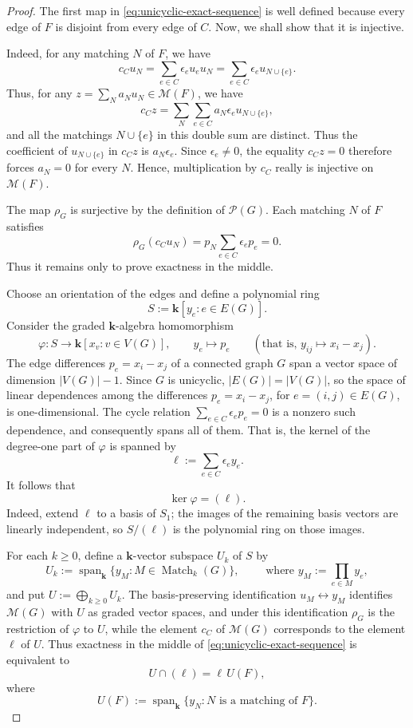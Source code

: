 \documentclass[12pt]{amsart}
\theoremstyle{definition}
\theoremstyle{remark}
\newcommand{\kk}{\mathbf{k}}
\newcommand{\Span}{\operatorname{span}}
\newcommand{\Match}{\operatorname{Match}}
\begin{document}
\begin{proof}
The first map in \eqref{eq:unicyclic-exact-sequence} is well defined because
every edge of $F$ is disjoint from every edge of $C$.
Now, we shall show that it is injective.

Indeed, for any matching $N$ of $F$, we have
\[
 c_Cu_N = \sum_{e\in C}\epsilon_e u_e u_N
 = \sum_{e\in C}\epsilon_e u_{N\cup\{e\}}.
\]
Thus, for any $z=\sum_N a_Nu_N\in\mathcal M(F)$, we have
\[
 c_C z
 = \sum_N \sum_{e\in C} a_N \epsilon_e u_{N\cup\{e\}},
\]
and all the matchings $N\cup\{e\}$ in this double sum are distinct.
Thus the coefficient of $u_{N\cup\{e\}}$ in $c_Cz$ is
$a_N\epsilon_e$.  Since $\epsilon_e\neq0$, the equality $c_Cz=0$
therefore forces $a_N=0$ for every $N$.
Hence, multiplication by $c_C$ really is injective on
$\mathcal M(F)$.

The map $\rho_G$ is surjective by the definition of $\mathcal P(G)$.
Each matching $N$ of $F$ satisfies
\[
 \rho_G(c_Cu_N)
 =p_N\sum_{e\in C}\epsilon_ep_e
 =0.
\]
Thus it remains only to prove exactness in the middle.

Choose an orientation of the edges and define a polynomial ring
\[
 S:=\kk[y_e:e\in E(G)].
\]
Consider the graded $\kk$-algebra homomorphism
\[
 \varphi:S\longrightarrow\kk[x_v:v\in V(G)],
 \qquad
 y_e \longmapsto p_e
 \qquad \left(\text{that is, }
 y_{ij}\longmapsto x_i-x_j\right).
\]
The edge differences $p_e = x_i - x_j$
of a connected graph $G$ span a vector space of dimension
$|V(G)|-1$.  Since $G$ is unicyclic, $|E(G)|=|V(G)|$, so the space of
linear dependences among the differences $p_e=x_i-x_j$, for
$e=(i,j)\in E(G)$, is one-dimensional.  The cycle relation
$\sum_{e\in C}\epsilon_ep_e=0$ is a nonzero such dependence,
and consequently spans all of them.  That is, the
kernel of the degree-one part of $\varphi$ is spanned by
\[
 \ell:=\sum_{e\in C}\epsilon_e y_e.
\]
It follows that
\begin{equation}\label{eq:unicyclic-kernel-phi}
 \ker\varphi=(\ell).
\end{equation}
Indeed, extend $\ell$ to a basis of $S_1$; the images of the remaining basis
vectors are linearly independent, so $S/(\ell)$ is the polynomial ring on
those images.

For each $k \geq 0$, define a $\kk$-vector subspace $U_k$ of $S$ by
\[
 U_k:=\Span_{\kk}\{y_M:M\in\Match_k(G)\},
 \qquad \text{ where }
 y_M:=\prod_{e\in M}y_e,
\]
and put $U:=\bigoplus_{k\geq0}U_k$.  The basis-preserving identification
$u_M\leftrightarrow y_M$ identifies $\mathcal M(G)$ with $U$ as graded vector
spaces, and under this identification $\rho_G$ is the restriction of
$\varphi$ to $U$, while the element $c_C$ of $\mathcal M(G)$ corresponds
to the element $\ell$ of $U$.  Thus exactness in the middle of
\eqref{eq:unicyclic-exact-sequence} is equivalent to
\begin{equation}\label{eq:unicyclic-intersection}
 U\cap(\ell)=\ell\,U(F),
\end{equation}
where
\[
 U(F):=\Span_{\kk}\{y_N:N\text{ is a matching of }F\}.
\]


\end{proof}
\end{document}
